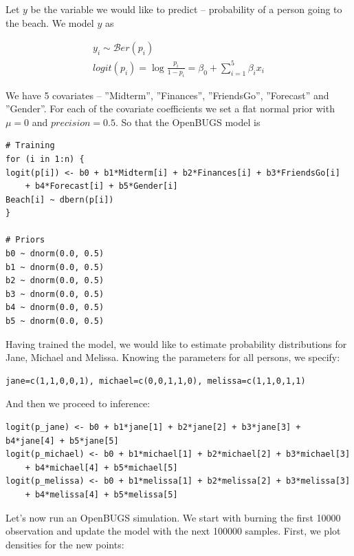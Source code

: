 \documentclass[a4 paper]{article}
\begin{document}
	




Let $y$ be the variable we would like to 
predict -- probability of a person going 
to the beach.
We model $y$ as

\begin{align*}
y_{i}	\sim\mathcal{B}er\left(p_{i}\right) \\
logit\left(p_{i}\right)=\log\frac{p_{i}}{1-p_{i}}=\beta_{0}+\sum_{i=1}^{5}\beta_{i}x_{i}
\end{align*}

We have 5 covariates -- ''Midterm'',  ''Finances'',  
''FriendsGo'',  ''Forecast'' and ''Gender''. 
For each of the covariate coefficients we set a 
flat normal prior with $\mu=0$ and $precision=0.5$. 
So that the OpenBUGS model is 

\begin{Verbatim}
# Training
for (i in 1:n) {
logit(p[i]) <- b0 + b1*Midterm[i] + b2*Finances[i] + b3*FriendsGo[i] 
	+ b4*Forecast[i] + b5*Gender[i]
Beach[i] ~ dbern(p[i])
}

# Priors
b0 ~ dnorm(0.0, 0.5)
b1 ~ dnorm(0.0, 0.5)
b2 ~ dnorm(0.0, 0.5)
b3 ~ dnorm(0.0, 0.5)
b4 ~ dnorm(0.0, 0.5)
b5 ~ dnorm(0.0, 0.5)
\end{Verbatim}

Having trained the model, we would like
to estimate probability distributions 
for Jane, Michael and Melissa.
Knowing the parameters for 
all persons, we specify:

\begin{Verbatim}
jane=c(1,1,0,0,1), michael=c(0,0,1,1,0), melissa=c(1,1,0,1,1)
\end{Verbatim}

And then we proceed to inference:

\begin{Verbatim}
logit(p_jane) <- b0 + b1*jane[1] + b2*jane[2] + b3*jane[3] + b4*jane[4] + b5*jane[5]
logit(p_michael) <- b0 + b1*michael[1] + b2*michael[2] + b3*michael[3] 
	+ b4*michael[4] + b5*michael[5]
logit(p_melissa) <- b0 + b1*melissa[1] + b2*melissa[2] + b3*melissa[3] 
	+ b4*melissa[4] + b5*melissa[5]
\end{Verbatim}

Let's now run an OpenBUGS simulation. We start 
with burning 
the first 10000 observation and update the model 
with the next 100000 samples. First, we plot 
densities for the new points:
\end{document}
